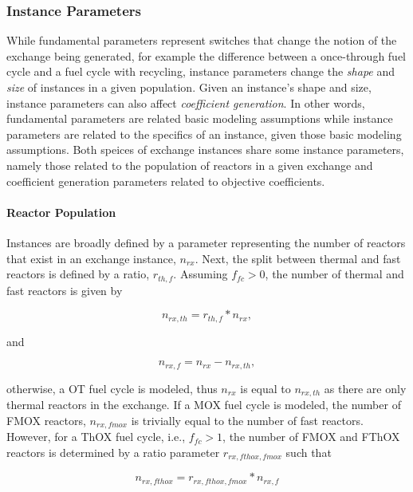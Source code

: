 \subsubsection{Instance Parameters}

While fundamental parameters represent switches that change the notion of the
exchange being generated, for example the difference between a once-through fuel
cycle and a fuel cycle with recycling, instance parameters change the
\textit{shape} and \textit{size} of instances in a given population. Given an
instance's shape and size, instance parameters can also affect
\textit{coefficient generation}. In other words, fundamental parameters are
related basic modeling assumptions while instance parameters are related to the
specifics of an instance, given those basic modeling assumptions. Both speices
of exchange instances share some instance parameters, namely those related to
the population of reactors in a given exchange and coefficient generation
parameters related to objective coefficients.

\paragraph{Reactor Population}

Instances are broadly defined by a parameter representing the number of reactors
that exist in an exchange instance, $n_{rx}$. Next, the split between thermal
and fast reactors is defined by a ratio, $r_{th, f}$. Assuming $f_{fc} > 0$, the
number of thermal and fast reactors is given by

\begin{equation}
n_{rx, th} = r_{th, f} * n_{rx},
\end{equation}

and 

\begin{equation}
n_{rx, f} = n_{rx} - n_{rx, th},
\end{equation}

otherwise, a OT fuel cycle is modeled, thus $n_{rx}$ is equal to $n_{rx, th}$ as
there are only thermal reactors in the exchange. If a MOX fuel cycle is modeled,
the number of FMOX reactors, $n_{rx, fmox}$ is trivially equal to the number of
fast reactors. However, for a ThOX fuel cycle, i.e., $f_{fc} > 1$, the number of
FMOX and FThOX reactors is determined by a ratio parameter $r_{rx, fthox, fmox}$
such that 

\begin{equation}
n_{rx, fthox} = r_{rx, fthox, fmox} * n_{rx, f}
\end{equation}

